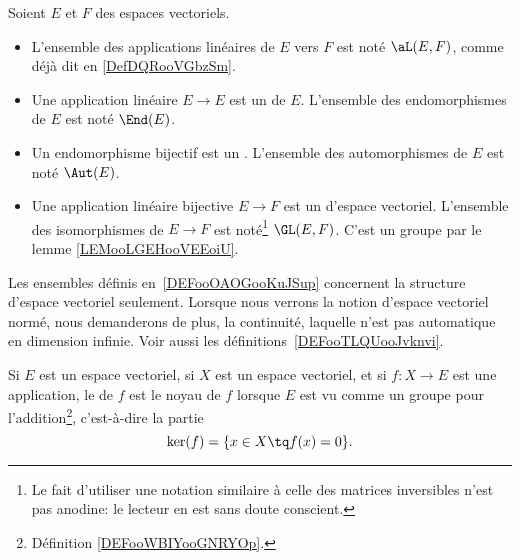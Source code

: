 \begin{definition}       \label{DEFooOAOGooKuJSup}
	Soient \( E\) et \( F\) des espaces vectoriels.
	\begin{itemize}
		\item
            L'ensemble des applications linéaires de \( E\) vers \( F\) est noté \( \aL(E,F)\), comme déjà dit en \ref{DefDQRooVGbzSm}.
		\item Une application linéaire \( E\to E\) est un  de \( E\). L'ensemble des endomorphismes de \( E\) est noté \( \End(E)\).
		\item Un endomorphisme bijectif est un . L'ensemble des automorphismes de \( E\) est noté \( \Aut(E)\).
		\item
            Une application linéaire bijective \( E\to F\) est un  d'espace vectoriel. L'ensemble des isomorphismes de \( E\to F\) est noté\footnote{Le fait d'utiliser une notation similaire à celle des matrices inversibles n'est pas anodine: le lecteur en est sans doute conscient.} \( \GL(E,F)\). C'est un groupe par le lemme \ref{LEMooLGEHooVEEoiU}.
	\end{itemize}
\end{definition}

\begin{remark}
	Les ensembles définis en~\ref{DEFooOAOGooKuJSup} concernent la structure d'espace vectoriel seulement. Lorsque nous verrons la notion d'espace vectoriel normé, nous demanderons de plus, la continuité, laquelle n'est pas automatique en dimension infinie. Voir aussi les définitions~\ref{DEFooTLQUooJvknvi}.
\end{remark}

\begin{definition}
	Si \( E\) est un espace vectoriel, si \( X\) est un espace vectoriel, et si \( f\colon X\to E\) est une application, le  de \( f\) est le noyau de \( f\) lorsque \( E\) est vu comme un groupe pour l'addition\footnote{Définition \ref{DEFooWBIYooGNRYOp}.}, c'est-à-dire la partie
	\begin{equation}
		\ker(f)=\{ x\in X\tq f(x)=0 \}.
	\end{equation}
\end{definition}

